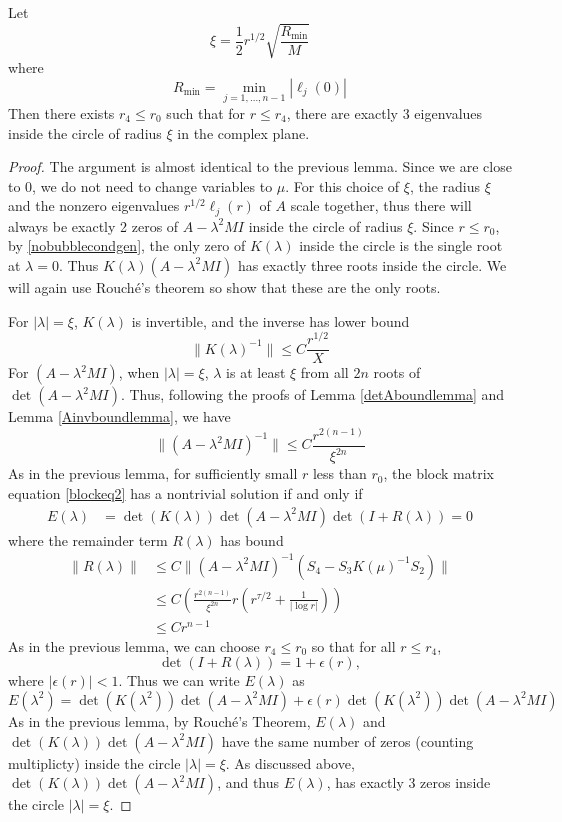 \documentclass[thesis.tex]{subfiles}
\begin{document}
\begin{lemma}\label{eigcount2}
Let 
\begin{equation}\label{xiradius}
\xi = \frac{1}{2}r^{1/2} \sqrt{\frac{R_{\min}}{M}}
\end{equation}
where
\[
R_{\min} = \min_{j = 1, \dots, n-1} |\ell_j(0) |
\]
Then there exists $r_4 \leq r_0$ such that for $r \leq r_4$, there are exactly 3 eigenvalues inside the circle of radius $\xi$ in the complex plane.

\begin{proof}
The argument is almost identical to the previous lemma. Since we are close to 0, we do not need to change variables to $\mu$. For this choice of $\xi$, the radius $\xi$ and the nonzero eigenvalues $r^{1/2}\ell_j(r)$ of $A$ scale together, thus there will always be exactly 2 zeros of $A - \lambda^2 M I$ inside the circle of radius $\xi$. Since $r \leq r_0$, by \cref{nobubblecondgen}, the only zero of $K(\lambda)$ inside the circle is the single root at $\lambda = 0$. Thus $K(\lambda)(A - \lambda^2 M I)$ has exactly three roots inside the circle. We will again use Rouch\'e's theorem so show that these are the only roots.

For $|\lambda| = \xi$, $K(\lambda)$ is invertible, and the inverse has lower bound
\[
\| K(\lambda)^{-1}\| \leq C \frac{r^{1/2}}{X}
\]
For $(A - \lambda^2 M I)$, when $|\lambda| = \xi$, $\lambda$ is at least $\xi$ from all $2n$ roots of $\det(A - \lambda^2 M I)$. Thus, following the proofs of Lemma \ref{detAboundlemma} and Lemma \ref{Ainvboundlemma}, we have
\[
\| (A - \lambda^2 M I)^{-1} \| \leq C \frac{ r^{2(n-1)}}{\xi^{2n}} 
\]
As in the previous lemma, for sufficiently small $r$ less than $r_0$, the block matrix equation \cref{blockeq2} has a nontrivial solution if and only if 
\begin{align*}
E(\lambda) &= \det(K(\lambda))\det(A - \lambda^2 MI)\det(I + R(\lambda)) = 0
\end{align*}
where the remainder term $R(\lambda)$ has bound
\begin{align*}
\| R(\lambda) \| &\leq C \| (A - \lambda^2 MI)^{-1}(S_4 - S_3 K(
\mu)^{-1} S_2) \| \\
&\leq C \left( \frac{r^{2(n-1)}}{\xi^{2n}} r \left( r^{\tau/2} + \frac{1}{|\log r| } \right) \right) \\
&\leq C r^{n-1}
\end{align*}
As in the previous lemma, we can choose $r_4 \leq r_0$ so that for all $r \leq r_4$, 
\[
\det(I + R(\lambda)) = 1 + \epsilon(r),
\]
where $|\epsilon(r)| < 1$. Thus we can write $E(\lambda)$ as
\begin{equation}
E(\lambda^2) = \det(K(\lambda^2))\det(A - \lambda^2 MI) + \epsilon(r) \det(K(\lambda^2))\det(A - \lambda^2 MI)
\end{equation}
As in the previous lemma, by Rouch\'e's Theorem, $E(\lambda)$ and $\det(K(\lambda))\det(A - \lambda^2 MI)$ have the same number of zeros (counting multiplicty) inside the circle $|\lambda| = \xi$. As discussed above, $\det(K(\lambda))\det(A - \lambda^2 MI)$, and thus $E(\lambda)$, has exactly 3 zeros inside the circle $|\lambda| = \xi$.
\end{proof}
\end{lemma}
\end{document}
